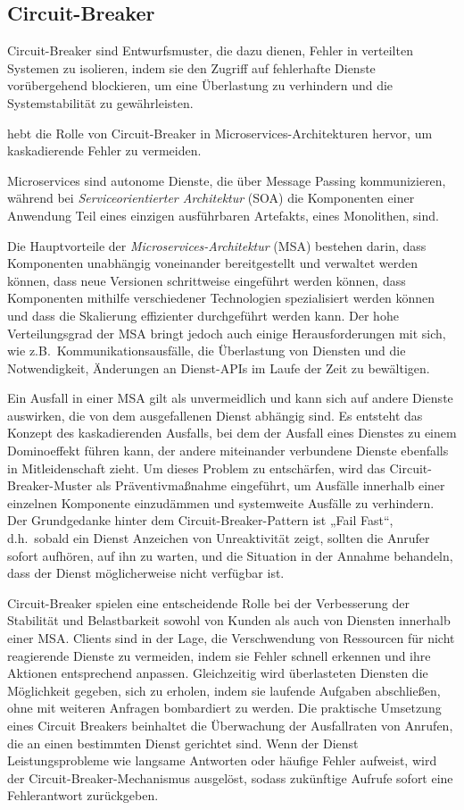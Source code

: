 \subsection{Circuit-Breaker}


Circuit-Breaker sind Entwurfsmuster, die dazu dienen, Fehler in verteilten Systemen zu isolieren,
indem sie den Zugriff auf fehlerhafte Dienste vorübergehend blockieren,
um eine Überlastung zu verhindern und die Systemstabilität zu gewährleisten.

\cite{Montesi.19.09.2016} hebt die Rolle von Circuit-Breaker in Microservices-Architekturen hervor,
um kaskadierende Fehler zu vermeiden.

Microservices sind autonome Dienste, die über Message Passing kommunizieren,
während bei \textit{Serviceorientierter Architektur} (SOA) die Komponenten einer Anwendung Teil eines
einzigen ausführbaren Artefakts, eines Monolithen, sind.

Die Hauptvorteile der \textit{Microservices-Architektur} (MSA) bestehen darin,
dass Komponenten unabhängig voneinander bereitgestellt und verwaltet werden können,
dass neue Versionen schrittweise eingeführt werden können, dass Komponenten
mithilfe verschiedener Technologien spezialisiert werden können und dass die Skalierung
effizienter durchgeführt werden kann.
Der hohe Verteilungsgrad der MSA bringt jedoch auch einige Herausforderungen mit sich,
wie z.B.\ Kommunikationsausfälle, die Überlastung von Diensten und die Notwendigkeit,
Änderungen an Dienst-APIs im Laufe der Zeit zu bewältigen.

Ein Ausfall in einer MSA gilt als unvermeidlich und kann
sich auf andere Dienste auswirken, die von dem ausgefallenen Dienst abhängig sind.
Es entsteht das Konzept des kaskadierenden Ausfalls, bei dem der Ausfall eines Dienstes
zu einem Dominoeffekt führen kann, der andere miteinander verbundene Dienste ebenfalls in
Mitleidenschaft zieht.
Um dieses Problem zu entschärfen, wird das Circuit-Breaker-Muster als Präventivmaßnahme eingeführt,
um Ausfälle innerhalb einer einzelnen Komponente einzudämmen und systemweite Ausfälle zu verhindern.
Der Grundgedanke hinter dem Circuit-Breaker-Pattern ist „Fail Fast“, d.h.\ sobald ein Dienst Anzeichen
von Unreaktivität zeigt, sollten die Anrufer sofort aufhören, auf ihn zu warten,
und die Situation in der Annahme behandeln, dass der Dienst möglicherweise nicht verfügbar ist.

Circuit-Breaker spielen eine entscheidende Rolle bei der Verbesserung der Stabilität und
Belastbarkeit sowohl von Kunden als auch von Diensten innerhalb einer MSA\@.
Clients sind in der Lage, die Verschwendung von Ressourcen für nicht reagierende Dienste zu vermeiden,
indem sie Fehler schnell erkennen und ihre Aktionen entsprechend anpassen.
Gleichzeitig wird überlasteten Diensten die Möglichkeit gegeben, sich zu erholen,
indem sie laufende Aufgaben abschließen, ohne mit weiteren Anfragen bombardiert zu werden.
Die praktische Umsetzung eines Circuit Breakers beinhaltet die Überwachung der Ausfallraten von Anrufen,
die an einen bestimmten Dienst gerichtet sind.
Wenn der Dienst Leistungsprobleme wie langsame Antworten oder häufige Fehler aufweist,
wird der Circuit-Breaker-Mechanismus ausgelöst,
sodass zukünftige Aufrufe sofort eine Fehlerantwort zurückgeben.

